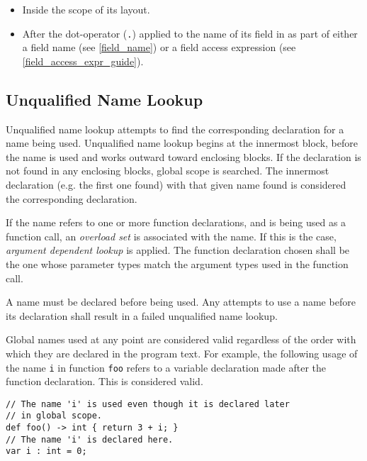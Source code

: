 \begin{itemize}
\item Inside the scope of its layout.
\item After the dot-operator (\texttt{.}) applied to the name of its field in as part of either a field name (see \ref{field_name}) or a field access expression (see \ref{field_access_expr_guide}).
\end{itemize}

\subsection{Unqualified Name Lookup} \label{unqlfd_lookup}

Unqualified name lookup attempts to find the corresponding declaration for a name being used. Unqualified name lookup begins at the innermost block, before the name is used and works outward toward enclosing blocks. If the declaration is not found in any enclosing blocks, global scope is searched. The innermost declaration (e.g. the first one found) with that given name found is considered the corresponding declaration. 

If the name refers to one or more function declarations, and is being used as a function call, an \textit{overload set} is associated with the name. If this is the case, \textit{argument dependent lookup} is applied. The function declaration chosen shall be the one whose parameter types match the argument types used in the function call.

A name must be declared before being used. Any attempts to use a name before its declaration shall result in a failed unqualified name lookup.

Global names used at any point are considered valid regardless of the order with which they are declared in the program text. For example, the following usage of the name \texttt{i} in function \texttt{foo} refers to a variable declaration made after the function declaration. This is considered valid.

\noindent\begin{minipage}{\linewidth}

\begin{lstlisting}
// The name 'i' is used even though it is declared later
// in global scope.
def foo() -> int { return 3 + i; }
// The name 'i' is declared here.
var i : int = 0;
\end{lstlisting}

\end{minipage}

